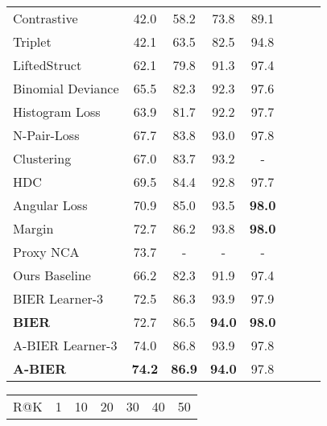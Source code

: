 \documentclass[10pt,journal,compsoc]{IEEEtran}
\begin{document}
\begin{table*}[!htbp]
\begin{minipage}[t]{0.5\textwidth}
\begin{tabular}{l|ccccccc}
        \hline
        Contrastive \cite{oh2016deep}                  & 42.0 & 58.2 & 73.8 & 89.1      \\
        Triplet \cite{oh2016deep}                      & 42.1  & 63.5  & 82.5 & 94.8    \\
        LiftedStruct \cite{oh2016deep}                 & 62.1 & 79.8 & 91.3 & 97.4      \\
        Binomial Deviance \cite{ustinova2016histogram} & 65.5  & 82.3  & 92.3 & 97.6    \\
        Histogram Loss \cite{ustinova2016histogram}    & 63.9  & 81.7  & 92.2 & 97.7    \\
        N-Pair-Loss \cite{sohn2016improved}            & 67.7 & 83.8  & 93.0 & 97.8  \\
        Clustering~\cite{song2017cvpr}            & 67.0 & 83.7 & 93.2 & - \\
        HDC~\cite{yuan2016hard}          & 69.5 & 84.4 & 92.8 & 97.7     \\
        Angular Loss~\cite{wang2017iccv} & 70.9 & 85.0 & 93.5 & \textbf{98.0} \\
        Margin~\cite{wu2017iccv}         & 72.7 & 86.2 & 93.8 & \textbf{98.0} \\
        Proxy NCA~\cite{movshovitz-attias2017iccv} & 73.7 & - & - & - \\
        \hline
        Ours Baseline                                  & 66.2 & 82.3 & 91.9 & 97.4 \\
        BIER Learner-3~\cite{opitz2017bier}            & 72.5 & 86.3 & 93.9 & 97.9 \\
        \textbf{BIER}~\cite{opitz2017bier}             & 72.7 & 86.5 & \textbf{94.0} & \textbf{98.0}   \\
        \hline
        A-BIER Learner-3                     & 74.0 & 86.8 & 93.9   &  97.8 \\
        \textbf{A-BIER}                      & \textbf{74.2} & \textbf{86.9} & \textbf{94.0} & 97.8          \\
        \hline
    \end{tabular}
    \end{minipage}
    \hfill
    \begin{minipage}[t]{0.5\textwidth}
    \centering
    \caption{Comparison with the state-of-the-art on the In-Shop Clothes Retrieval~\cite{liu2016deepfashion} dataset.}
    \label{tbl:sota-clothes}
    \renewcommand{\arraystretch}{1.3}
    \begin{tabular}{l|cccccc}
    \hline
    R@K             & 1 & 10 & 20 & 30 & 40 & 50 \\

\end{tabular}
\end{minipage}
\end{table*}
\end{document}
